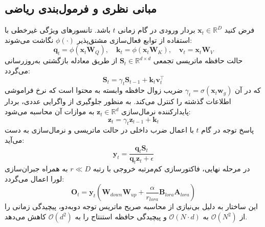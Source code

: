 \subsection{مبانی نظری و فرمول‌بندی ریاضی}
فرض کنید $\mathbf{x}_t \in \mathbb{R}^D$ بردار ورودی در گام زمانی $t$ باشد. تانسورهای ویژگی غیرخطی با استفاده از توابع فعال‌سازی مشتق‌پذیر $\phi(\cdot)$ نگاشت می‌شوند:
\begin{equation}
\mathbf{q}_t = \phi(\mathbf{x}_t \mathbf{W}_Q), \quad \mathbf{k}_t = \phi(\mathbf{x}_t \mathbf{W}_K), \quad \mathbf{v}_t = \mathbf{x}_t \mathbf{W}_V
\end{equation}
حالت حافظه ماتریسی تجمعی $\mathbf{S}_t \in \mathbb{R}^{d \times d}$ از طریق معادله بازگشتی به‌روزرسانی می‌گردد:
\begin{equation}
\mathbf{S}_t = \gamma_t \mathbf{S}_{t-1} + \mathbf{k}_t \mathbf{v}_t^\top
\end{equation}
که در آن $\gamma_t = \sigma(\mathbf{x}_t \mathbf{w}_g)$ ضریب زوال حافظه وابسته به محتوا است که نرخ فراموشی اطلاعات گذشته را کنترل می‌کند. به منظور جلوگیری از واگرایی عددی، بردار پایدارکننده نرمال‌سازی $\mathbf{z}_t \in \mathbb{R}^d$ به موازات آن محاسبه می‌شود:
\begin{equation}
\mathbf{z}_t = \gamma_t \mathbf{z}_{t-1} + \mathbf{k}_t
\end{equation}
پاسخ توجه در گام $t$ با اعمال ضرب داخلی در حالت ماتریسی و نرمال‌سازی به دست می‌آید:
\begin{equation}
\mathbf{y}_t = \frac{\mathbf{q}_t \mathbf{S}_t}{\mathbf{q}_t \mathbf{z}_t + \epsilon}
\end{equation}
در مرحله نهایی، فاکتورسازی کم‌مرتبه خروجی با رتبه $r \ll D$ به همراه جبران‌سازی لورا اعمال می‌گردد:
\begin{equation}
\mathbf{O}_t = \mathbf{y}_t \left( \mathbf{W}_{down} \mathbf{W}_{up} + \frac{\alpha}{r_{lora}} \mathbf{B}_{lora} \mathbf{A}_{lora} \right)
\end{equation}
این ساختار به دلیل بی‌نیازی از محاسبه صریح ماتریس توجه دو‌به‌دو، پیچیدگی زمانی را از $\mathcal{O}(N^2)$ به $\mathcal{O}(N \cdot d)$ و پیچیدگی حافظه استنتاج را به $\mathcal{O}(d^2)$ کاهش می‌دهد.

